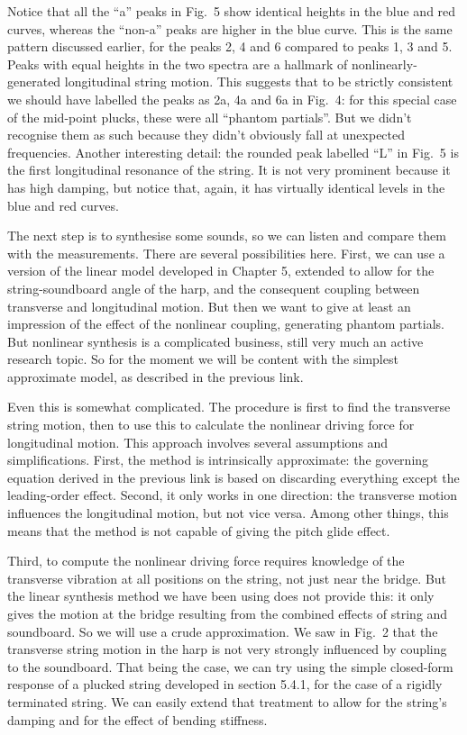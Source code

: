   Notice that all the ``a'' peaks in Fig.\ 5 show identical heights in the blue 
  and red curves, whereas the ``non-a'' peaks are higher in the blue curve. 
  This is the same pattern discussed earlier, for the peaks 2, 4 and 6 compared 
  to peaks 1, 3 and 5. Peaks with equal heights in the two spectra are a 
  hallmark of nonlinearly-generated longitudinal string motion. This suggests 
  that to be strictly consistent we should have labelled the peaks as 2a, 4a 
  and 6a in Fig.\ 4: for this special case of the mid-point plucks, these were 
  all ``phantom partials''. But we didn't recognise them as such because they 
  didn't obviously fall at unexpected frequencies. Another interesting detail: 
  the rounded peak labelled ``L'' in Fig.\ 5 is the first longitudinal 
  resonance of the string. It is not very prominent because it has high 
  damping, but notice that, again, it has virtually identical levels in the 
  blue and red curves. 

  The next step is to synthesise some sounds, so we can listen and compare them 
  with the measurements. There are several possibilities here. First, we can 
  use a version of the linear model developed in Chapter 5, extended to allow 
  for the string-soundboard angle of the harp, and the consequent coupling 
  between transverse and longitudinal motion. But then we want to give at least 
  an impression of the effect of the nonlinear coupling, generating phantom 
  partials. But nonlinear synthesis is a complicated business, still very much 
  an active research topic. So for the moment we will be content with the 
  simplest approximate model, as described in the previous link. 

  Even this is somewhat complicated. The procedure is first to find the 
  transverse string motion, then to use this to calculate the nonlinear driving 
  force for longitudinal motion. This approach involves several assumptions and 
  simplifications. First, the method is intrinsically approximate: the 
  governing equation derived in the previous link is based on discarding 
  everything except the leading-order effect. Second, it only works in one 
  direction: the transverse motion influences the longitudinal motion, but not 
  vice versa. Among other things, this means that the method is not capable of 
  giving the pitch glide effect. 

  Third, to compute the nonlinear driving force requires knowledge of the 
  transverse vibration at all positions on the string, not just near the 
  bridge. But the linear synthesis method we have been using does not provide 
  this: it only gives the motion at the bridge resulting from the combined 
  effects of string and soundboard. So we will use a crude approximation. We 
  saw in Fig.\ 2 that the transverse string motion in the harp is not very 
  strongly influenced by coupling to the soundboard. That being the case, we 
  can try using the simple closed-form response of a plucked string developed 
  in section 5.4.1, for the case of a rigidly terminated string. We can easily 
  extend that treatment to allow for the string’s damping and for the effect of 
  bending stiffness. 

